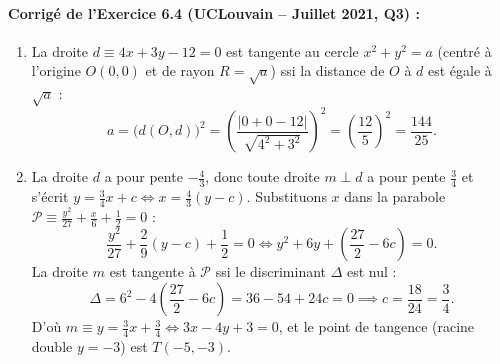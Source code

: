 \paragraph{Corrigé de l'Exercice 6.4 (UCLouvain -- Juillet 2021, Q3) :}
\begin{enumerate}[label=(\alph*)]
    \item La droite $d \equiv 4x + 3y - 12 = 0$ est tangente au cercle $x^2 + y^2 = a$ (centré à l'origine $O(0,0)$ et de rayon $R = \sqrt{a}$) ssi la distance de $O$ à $d$ est égale à $\sqrt{a}$ :
    \[
        a = \bigl(d(O, d)\bigr)^2 = \left(\frac{|0 + 0 - 12|}{\sqrt{4^2 + 3^2}}\right)^2 = \left(\frac{12}{5}\right)^2 = \boxed{\frac{144}{25}}.
    \]
    \item La droite $d$ a pour pente $-\frac{4}{3}$, donc toute droite $m \perp d$ a pour pente $\frac{3}{4}$ et s'écrit $y = \frac{3}{4}x + c \iff x = \frac{4}{3}(y - c)$. Substituons $x$ dans la parabole $\mathcal{P} \equiv \frac{y^2}{27} + \frac{x}{6} + \frac{1}{2} = 0$ :
    \[
        \frac{y^2}{27} + \frac{2}{9}(y - c) + \frac{1}{2} = 0 \iff y^2 + 6y + \left(\frac{27}{2} - 6c\right) = 0.
    \]
    La droite $m$ est tangente à $\mathcal{P}$ ssi le discriminant $\Delta$ est nul :
    \[
        \Delta = 6^2 - 4\left(\frac{27}{2} - 6c\right) = 36 - 54 + 24c = 0 \implies c = \frac{18}{24} = \frac{3}{4}.
    \]
    D'où $\boxed{m \equiv y = \frac{3}{4}x + \frac{3}{4} \iff 3x - 4y + 3 = 0}$, et le point de tangence (racine double $y = -3$) est $\boxed{T(-5, -3)}$.
\end{enumerate}

